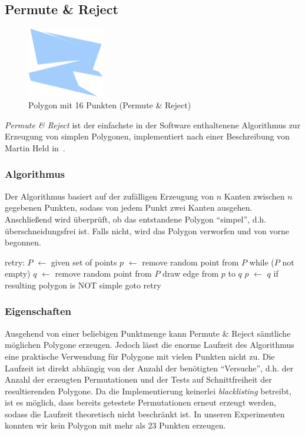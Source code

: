 \subsection{Permute \& Reject}

  \begin{figure}[h]
    \begin{center}
      \includegraphics[width=0.3\textwidth]{img/permute16.eps}
    \end{center}
    \caption{Polygon mit 16 Punkten (Permute \& Reject)}
    \label{fig:permute16}
  \end{figure}

  \emph{Permute \& Reject} ist der einfachste in der Software enthaltenene
  Algorithmus zur Erzeugung von simplen Polygonen, implementiert nach einer
  Beschreibung von Martin Held in~\cite{held98polygons}.

  \subsubsection{Algorithmus}

    Der Algorithmus basiert auf der zufälligen Erzeugung von $n$ Kanten zwischen
    $n$ gegebenen Punkten, sodass von jedem Punkt zwei Kanten ausgehen.
    Anschließend wird überprüft, ob das entstandene Polygon \enquote{simpel},
    d.h. überschneidungsfrei ist. Falls nicht, wird das Polygon verworfen und
    von vorne begonnen.

\begin{code}[caption={Permute \& Reject},label=permutelisting,mathescape=true]
retry:
$P$ $\leftarrow$ given set of points
$p$ $\leftarrow$ remove random point from $P$
while ($P$ not empty)
  $q$ $\leftarrow$ remove random point from $P$
  draw edge from $p$ to $q$
  $p$ $\leftarrow$ $q$
if resulting polygon is NOT simple
  goto retry
\end{code}

  \subsubsection{Eigenschaften}

    Ausgehend von einer beliebigen Punktmenge kann Permute \& Reject sämtliche
    möglichen Polygone erzeugen. Jedoch lässt die enorme Laufzeit des
    Algorithmus eine praktische Verwendung für Polygone mit vielen Punkten
    nicht zu. Die Laufzeit ist direkt abhängig von der Anzahl der benötigten 
    \enquote{Versuche}, d.h. der Anzahl der erzeugten Permutationen und der
    Tests auf Schnittfreiheit der resultierenden Polygone. Da die Implementierung
    keinerlei \emph{blacklisting} betreibt, ist es möglich, dass bereits
    getestete Permutationen erneut erzeugt werden, sodass die Laufzeit theoretisch
    nicht beschränkt ist. In unseren Experimenten konnten wir kein Polygon mit mehr
    als 23 Punkten erzeugen.


